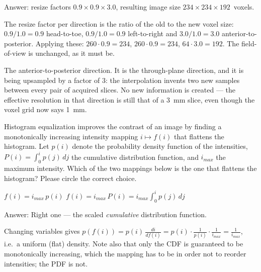 \documentclass[11pt]{exam}
\newcommand{\answerspace}[1]{\ifprintanswers\else\vspace{#1}\fi}
\begin{document}
\begin{questions}
\begin{parts}
  \begin{solution}
    Answer: resize factors $0.9 \times 0.9 \times 3.0$, resulting image size
    $234 \times 234 \times 192$~voxels.

    The resize factor per direction is the ratio of the old to the new voxel size: $0.9/1.0 = 0.9$
    head-to-toe, $0.9/1.0 = 0.9$ left-to-right and $3.0/1.0 = 3.0$ anterior-to-posterior.
    Applying these: $260 \cdot 0.9 = 234$, $260 \cdot 0.9 = 234$, $64 \cdot 3.0 = 192$. The
    field-of-view is unchanged, as it must be.

    The anterior-to-posterior direction. It is the through-plane direction, and it is being
    upsampled by a factor of 3: the interpolation invents two new samples between every pair of
    acquired slices. No new information is created --- the effective resolution in that direction
    is still that of a 3~mm slice, even though the voxel grid now says 1~mm.
  \end{solution}
\answerspace{4.5cm}

\end{parts}

\question
Histogram equalization improves the contrast of an image by finding a monotonically increasing
intensity mapping $i \mapsto f(i)$ that flattens the histogram. Let $p(i)$ denote the probability
density function of the intensities, $P(i) = \int_0^i p(j)\,dj$ the cumulative distribution
function, and $i_{max}$ the maximum intensity. Which of the two mappings below is the one that
flattens the histogram? Please circle the correct choice.

\vspace{2mm}
\begin{center}
  $\displaystyle f(i) = i_{max}\, p(i)$
  \hspace{2.6cm}
  $\displaystyle f(i) = i_{max}\, P(i) = i_{max} \int_0^i p(j)\, dj$
\end{center}
\vspace{2mm}

\begin{solution}
  Answer: Right one --- the scaled \emph{cumulative} distribution function.

  Changing variables gives
  $p(f(i)) = p(i)\,\frac{di}{df(i)} = p(i) \cdot \frac{1}{p(i)} \cdot \frac{1}{i_{max}}
  = \frac{1}{i_{max}}$, i.e.\ a uniform (flat) density. Note also that only the CDF is guaranteed
  to be monotonically increasing, which the mapping has to be in order not to reorder intensities;
  the PDF is not.
\end{solution}
\answerspace{1.5cm}


\end{questions}
\end{document}
